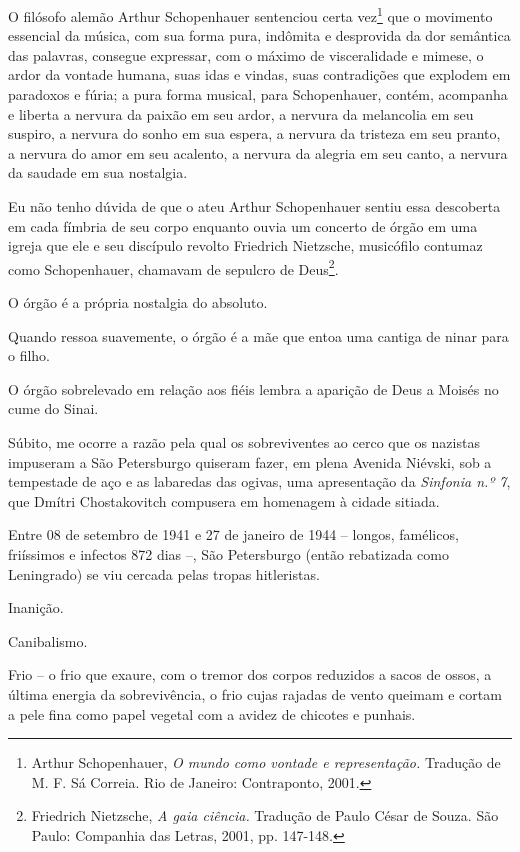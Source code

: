 O filósofo alemão Arthur Schopenhauer sentenciou certa vez\footnote{Arthur
  Schopenhauer, \emph{O mundo como vontade e representação.} Tradução de
  M. F. Sá Correia. Rio de Janeiro: Contraponto, 2001.} que o movimento
essencial da música, com sua forma pura, indômita e desprovida da dor
semântica das palavras, consegue expressar, com o máximo de
visceralidade e mimese, o ardor da vontade humana, suas idas e vindas,
suas contradições que explodem em paradoxos e fúria; a pura forma
musical, para Schopenhauer, contém, acompanha e liberta a nervura da
paixão em seu ardor, a nervura da melancolia em seu suspiro, a nervura
do sonho em sua espera, a nervura da tristeza em seu pranto, a nervura
do amor em seu acalento, a nervura da alegria em seu canto, a nervura da
saudade em sua nostalgia.

Eu não tenho dúvida de que o ateu Arthur Schopenhauer sentiu essa
descoberta em cada fímbria de seu corpo enquanto ouvia um concerto de
órgão em uma igreja que ele e seu discípulo revolto Friedrich Nietzsche,
musicófilo contumaz como Schopenhauer, chamavam de sepulcro de
Deus\footnote{Friedrich Nietzsche, \emph{A gaia ciência.} Tradução de
  Paulo César de Souza. São Paulo: Companhia das Letras, 2001, pp.
  147-148.}.

O órgão é a própria nostalgia do absoluto.

Quando ressoa suavemente, o órgão é a mãe que entoa uma cantiga de ninar
para o filho.

O órgão sobrelevado em relação aos fiéis lembra a aparição de Deus a
Moisés no cume do Sinai.

Súbito, me ocorre a razão pela qual os sobreviventes ao cerco que os
nazistas impuseram a São Petersburgo quiseram fazer, em plena Avenida
Niévski, sob a tempestade de aço e as labaredas das ogivas, uma
apresentação da \emph{Sinfonia n.º 7}, que Dmítri Chostakovitch
compusera em homenagem à cidade sitiada.

Entre 08 de setembro de 1941 e 27 de janeiro de 1944 -- longos,
famélicos, friíssimos e infectos 872 dias --, São Petersburgo (então
rebatizada como Leningrado) se viu cercada pelas tropas hitleristas.

Inanição.

Canibalismo.

Frio -- o frio que exaure, com o tremor dos corpos reduzidos a sacos de
ossos, a última energia da sobrevivência, o frio cujas rajadas de vento
queimam e cortam a pele fina como papel vegetal com a avidez de chicotes
e punhais.

